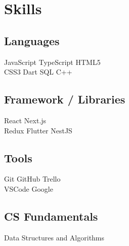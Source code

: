 \documentclass[]{deedy-resume-openfont}
\begin{document}
%
%
\lastupdated

%
%

%
%

\begin{minipage}[t]{0.28\textwidth} 



\section{Skills}
\subsection{Languages}

\textbullet JavaScript \textbullet TypeScript  \textbullet{} HTML5 \\ \textbullet CSS3 \textbullet{} Dart \textbullet SQL \textbullet{} C++ 
\sectionsep

\subsection{Framework / Libraries}
 \textbullet React \textbullet{}   Next.js \\ \textbullet{} Redux 
  \textbullet{} Flutter \textbullet{} NestJS
\sectionsep
\subsection{Tools}
 \textbullet Git \textbullet{}   GitHub \textbullet{} Trello\\ \textbullet{} VSCode  \textbullet{} Google 
\sectionsep
 \subsection{CS Fundamentals}
 \textbullet{}   Data Structures and Algorithms \\   \\ 
\sectionsep


\end{minipage}
\end{document}
